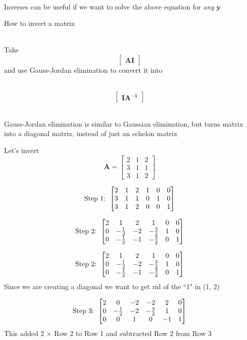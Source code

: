 \documentclass[10pt]{seminar}
\begin{document}
\begin{slide}
\ \\Inverses can be useful if we want to solve the above equation for \textit{any} $\mathbf{y}$

\newslide

How to invert a matrix

\ \\Take $$\begin{bmatrix}\mathbf{A I} \end{bmatrix}$$ and use Gauss-Jordan elimination to convert it into

\ \\$$\begin{bmatrix}\mathbf{I A^{-1}} \end{bmatrix}$$

\ \\Gauss-Jordan elimination is similar to Gaussian elimination, but turns matrix into a diagonal matrix, instead of just an echelon matrix

\newslide
Let's invert $$\mathbf{A}=\begin{bmatrix}
2&1&2\\
3&1&1\\
3&1&2
\end{bmatrix}$$


$$\hbox{Step 1: }\begin{bmatrix}
2&1&2& 1& 0& 0\\
3&1&1& 0& 1& 0\\
3&1&2& 0& 0&1
\end{bmatrix}$$

$$\hbox{Step 2: }\begin{bmatrix}
2&1&2& 1& 0& 0\\
0&-{1\over 2}&-2& -{3\over 2}&1 & 0\\
0&-{1\over 2}&-1& -{3\over 2}& 0&1
\end{bmatrix}$$

\newslide

$$\hbox{Step 2: }\begin{bmatrix}
2&1&2& 1& 0& 0\\
0&-{1\over 2}&-2& -{3\over 2}&1 & 0\\
0&-{1\over 2}&-1& -{3\over 2}& 0&1
\end{bmatrix}$$
Since we are creating a diagonal we want to get rid of the ``1" in (1, 2)

\vspace{.2in}
$$\hbox{Step 3: }\begin{bmatrix}
2&0&-2& -2& 2& 0\\
0&-{1\over 2}&-2& -{3\over 2}&1 & 0\\
0&0&1& 0& -1&1
\end{bmatrix}$$
This added 2 $\times$ Row 2 to Row 1 and subtracted Row 2 from Row 3


\end{slide}
\end{document}
